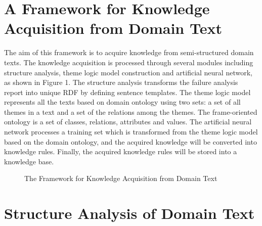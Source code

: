 \documentclass{elsart}
\begin{document}
\section{A Framework for Knowledge Acquisition from Domain Text
}
\label{sec:fram-knowl-acqu}

The aim of this framework is to acquire knowledge from semi-structured
domain texts. The knowledge acquisition is processed through several
modules including structure analysis, theme logic model construction
and artificial neural network, as shown in Figure 1. The structure
analysis transforms the failure analysis report into unique RDF by
defining sentence templates. The theme logic model represents all the
texts based on domain ontology using two sets: a set of all themes in
a text and a set of the relations among the themes. The frame-oriented ontology is a set of classes, relations, attributes and
values. The artificial neural network processes a training set which is 
transformed from the theme logic model based on the domain ontology,
and the acquired knowledge will be converted into knowledge rules. Finally, the acquired knowledge rules will be stored into a knowledge base.
\begin{figure}[htp]
  \centering

  \caption{The Framework for Knowledge Acquisition from Domain Text}
  \label{fig:1}
\end{figure}

\section{Structure Analysis of Domain Text 
}
\label{sec:struct-analys-doma}
\end{document}
